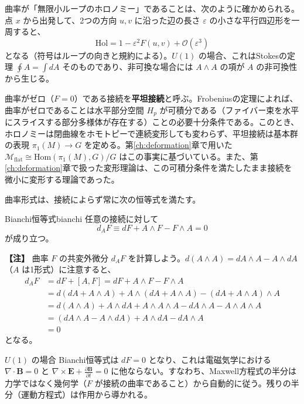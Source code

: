 \documentclass[uplatex, dvipdfmx, book]{jsbook}
\newenvironment{note}{\vspace{1ex}\par\footnotesize\noindent\textbf{【注】}}{\par\vspace{1ex}}
\begin{document}
曲率が「無限小ループのホロノミー」であることは、次のように確かめられる。点 $x$ から出発して、2つの方向 $u, v$ に沿った辺の長さ $\varepsilon$ の小さな平行四辺形を一周すると、
\begin{equation}
    \mathrm{Hol} = 1 - \varepsilon^2 F(u, v) + \mathcal{O}(\varepsilon^3)
\end{equation}
となる（符号はループの向きと規約による）。$U(1)$ の場合、これはStokesの定理 $\oint A = \int dA$ そのものであり、非可換な場合には $A \wedge A$ の項が $A$ の非可換性から生じる。

曲率がゼロ（$F=0$）である接続を\textbf{平坦接続}と呼ぶ。Frobeniusの定理によれば、曲率がゼロであることは水平部分空間 $H_p$ が可積分である（ファイバー束を水平にスライスする部分多様体が存在する）ことの必要十分条件である。このとき、ホロノミーは閉曲線をホモトピーで連続変形しても変わらず、平坦接続は基本群の表現 $\pi_1(M) \to G$ を定める。第\ref{ch:deformation}章で用いた $\mathcal{M}_{\text{flat}} \cong \mathrm{Hom}(\pi_1(M), G)/G$ はこの事実に基づいている。また、第\ref{ch:deformation}章で扱った変形理論は、この可積分条件を満たしたまま接続を微小に変形する理論であった。

曲率形式は、接続によらず常に次の恒等式を満たす。

\begin{myprop}{Bianchi恒等式}{bianchi}
任意の接続に対して
\begin{equation*}
    d_A F \equiv dF + A \wedge F - F \wedge A = 0
\end{equation*}
が成り立つ。
\end{myprop}

\begin{note}
曲率 $F$ の共変外微分 $d_A F$ を計算しよう。$d(A \wedge A) = dA \wedge A - A \wedge dA$（$A$ は1形式）に注意すると、
\begin{align*}
    d_A F &= dF + [A, F] = dF + A \wedge F - F \wedge A \\
    &= d(dA + A \wedge A) + A \wedge (dA + A \wedge A) - (dA + A \wedge A) \wedge A \\
    &= d(A \wedge A) + A \wedge dA + A \wedge A \wedge A - dA \wedge A - A \wedge A \wedge A \\
    &= (dA \wedge A - A \wedge dA) + A \wedge dA - dA \wedge A \\
    &= 0
\end{align*}
となる。
\end{note}

$U(1)$ の場合 Bianchi恒等式は $dF = 0$ となり、これは電磁気学における $\nabla \cdot \bm{B} = 0$ と $\nabla \times \bm{E} + \frac{\partial \bm{B}}{\partial t} = 0$ に他ならない。すなわち、Maxwell方程式の半分は力学ではなく幾何学（$F$ が接続の曲率であること）から自動的に従う。残りの半分（運動方程式）は作用から導かれる。
\end{document}

